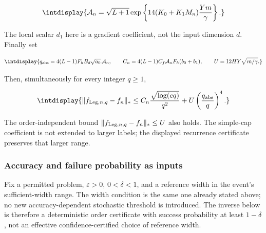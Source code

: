 \begingroup\renewcommand{\theHequation}{intdisplay.134}
\begin{equation}
\intdisplay{
\mathcal A_n=\sqrt{L+1}
\exp\left\{14(K_0+K_1M_n)\frac{Ym}\gamma\right\}.
}
\label{int:eq-0043-legendre-stability-coefficients}
\end{equation}
\endgroup


The local scalar \(d_1\) here is a gradient coefficient, not the input dimension \(d\). Finally set


\begingroup\renewcommand{\theHequation}{intdisplay.135}
\begin{equation}
\intdisplay{
q_{\rm abs}=4(L-1)F_hB_d\sqrt{a_0}\,\mathcal A_n,
\qquad C_n=4(L-1)C_f\mathcal A_nF_h(b_0+b_1),
\qquad U=12HY\sqrt{m/\gamma}.
}
\label{int:eq-0044-legendre-full-coefficients}
\end{equation}
\endgroup


Then, simultaneously for every integer \(q\ge1\),


\begingroup\renewcommand{\theHequation}{intdisplay.136}
\begin{equation}
\intdisplay{
\|f_{{\rm Leg},n,q}-f_n\|_*
\le C_n\frac{\sqrt{\log(eq)}}{q^2}
+U\left(\frac{q_{\rm abs}}{q}\right)^4.
}
\label{int:eq-0045-legendre-full-forward}
\end{equation}
\endgroup


The order-independent bound \(\|f_{{\rm Leg},\allowbreak n,\allowbreak q}-f_n\|_*\le U\) also holds. The simple-cap coefficient is not extended to larger labels; the displayed recurrence certificate preserves that larger range.


\subsubsection{Accuracy and failure probability as inputs}
\label{int:legendre-inverse-certificates}


Fix a permitted problem, \(\varepsilon>0\), \(0<\delta<1\), and a reference width in the event's sufficient-width range. The width condition is the same one already stated above; no new accuracy-dependent stochastic threshold is introduced. The inverse below is therefore a deterministic order certificate with success probability at least \(1-\delta\), not an effective confidence-certified choice of reference width.


